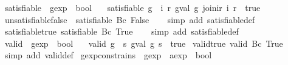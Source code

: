 \begin{isabellebody}
%
\isadelimproof
\isanewline
%
\endisadelimproof
\isanewline
{}\isamarkupfalse%
\ satisfiable\ {\isacharcolon}{\isacharcolon}\ {\isachardoublequoteopen}gexp\ {\isasymRightarrow}\ bool{\isachardoublequoteclose}\ \isanewline
\ \ {\isachardoublequoteopen}satisfiable\ g\ {\isasymequiv}\ {\isacharparenleft}{\isasymexists}i\ r{\isachardot}\ gval\ g\ {\isacharparenleft}join{\isacharunderscore}ir\ i\ r{\isacharparenright}\ {\isacharequal}\ true{\isacharparenright}{\isachardoublequoteclose}\isanewline
\isanewline
{}\isamarkupfalse%
\ unsatisfiable{\isacharunderscore}false{\isacharcolon}\ {\isachardoublequoteopen}{\isasymnot}\ satisfiable\ {\isacharparenleft}Bc\ False{\isacharparenright}{\isachardoublequoteclose}\isanewline
%
\isadelimproof
\ \ %
\endisadelimproof
%
\isatagproof
{}\isamarkupfalse%
\ {\isacharparenleft}simp\ add{\isacharcolon}\ satisfiable{\isacharunderscore}def{\isacharparenright}%
\endisatagproof
{\isafoldproof}%
%
\isadelimproof
\isanewline
%
\endisadelimproof
\isanewline
{}\isamarkupfalse%
\ satisfiable{\isacharunderscore}true{\isacharcolon}\ {\isachardoublequoteopen}satisfiable\ {\isacharparenleft}Bc\ True{\isacharparenright}{\isachardoublequoteclose}\isanewline
%
\isadelimproof
\ \ %
\endisadelimproof
%
\isatagproof
{}\isamarkupfalse%
\ {\isacharparenleft}simp\ add{\isacharcolon}\ satisfiable{\isacharunderscore}def{\isacharparenright}%
\endisatagproof
{\isafoldproof}%
%
\isadelimproof
\isanewline
%
\endisadelimproof
\isanewline
{}\isamarkupfalse%
\ valid\ {\isacharcolon}{\isacharcolon}\ {\isachardoublequoteopen}gexp\ {\isasymRightarrow}\ bool{\isachardoublequoteclose}\ \isanewline
\ \ {\isachardoublequoteopen}valid\ g\ {\isasymequiv}\ {\isacharparenleft}{\isasymforall}s{\isachardot}\ gval\ g\ s\ {\isacharequal}\ true{\isacharparenright}{\isachardoublequoteclose}\isanewline
\isanewline
{}\isamarkupfalse%
\ valid{\isacharunderscore}true{\isacharcolon}\ {\isachardoublequoteopen}valid\ {\isacharparenleft}Bc\ True{\isacharparenright}{\isachardoublequoteclose}\isanewline
%
\isadelimproof
\ \ %
\endisadelimproof
%
\isatagproof
{}\isamarkupfalse%
\ {\isacharparenleft}simp\ add{\isacharcolon}\ valid{\isacharunderscore}def{\isacharparenright}%
\endisatagproof
{\isafoldproof}%
%
\isadelimproof
\isanewline
%
\endisadelimproof
\isanewline
{}\isamarkupfalse%
\ gexp{\isacharunderscore}constrains\ {\isacharcolon}{\isacharcolon}\ {\isachardoublequoteopen}gexp\ {\isasymRightarrow}\ aexp\ {\isasymRightarrow}\ bool{\isachardoublequoteclose}\ \isanewline

\end{isabellebody}
